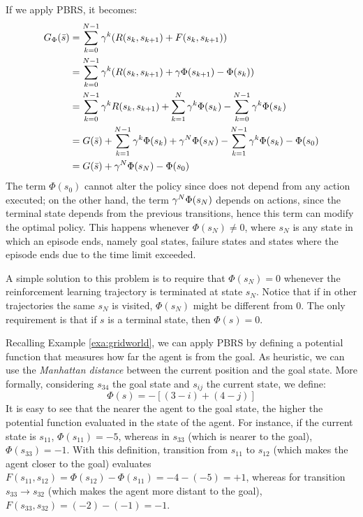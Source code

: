 If we apply PBRS, it becomes:
\begin{align}
	G_{\Phi}(\bar{s}) &= \sum_{k=0}^{N-1} \gamma^{k} (R(s_k, s_{k+1}) + F(s_k, s_{k+1})) \nonumber \\
	&= \sum_{k=0}^{N-1} \gamma^{k} (R(s_k, s_{k+1}) + \gamma\Phi(s_{k+1}) - \Phi(s_k) ) \nonumber \\
	&= \sum_{k=0}^{N-1} \gamma^{k} R(s_k, s_{k+1}) + \sum_{k=1}^{N} \gamma^{k}\Phi(s_{k}) - \sum_{k=0}^{N-1} \gamma^k\Phi(s_k) \nonumber \\
	&= G(\bar{s}) + \sum_{k=1}^{N-1} \gamma^{k}\Phi(s_{k}) + \gamma^N\Phi(s_N) - \sum_{k=1}^{N-1} \gamma^k\Phi(s_k) - \Phi(s_0) \nonumber \\
	&= G(\bar{s}) + \gamma^N\Phi(s_N) - \Phi(s_0) \label{eq:reward-shaping-episodic-terminal-state}
\end{align}
The term $\Phi(s_0)$ cannot alter the policy since does not depend from any action executed; on the other hand, the term $\gamma^N\Phi(s_N)$ depends on actions, since the terminal state depends from the previous transitions, hence this term can modify the optimal policy. This happens whenever $\Phi(s_N)\neq 0$, where $s_N$ is any state in which an episode ends, namely goal states, failure states and states where the episode ends due to the time limit exceeded.

A simple solution to this problem is to require that $\Phi(s_N)=0$ whenever the reinforcement learning trajectory is terminated at state $s_N$. Notice that if in other trajectories the same $s_N$ is visited, $\Phi(s_N)$ might be different from 0. The only requirement is that if $s$ is a terminal state, then $\Phi(s) = 0$.

\medskip
\begin{example}\label{exa:reward-shaping-gridworld}
	Recalling Example \ref{exa:gridworld}, we can apply PBRS by defining a potential function that measures how far the agent is from the goal. As heuristic, we can use the \emph{Manhattan distance} between the current position and the goal state. More formally, considering $s_{34}$ the goal state and $s_{ij}$ the current state, we define:
	\[
	\Phi(s) = - [(3 - i) + (4 - j)]
	\]
	It is easy to see that the nearer the agent to the goal state, the higher the potential function evaluated in the state of the agent. For instance, if the current state is $s_{11}$, $\Phi(s_{11}) = - 5$, whereas in $s_{33}$ (which is nearer to the goal), $\Phi(s_{33}) = -1$. 
	With this definition, transition from $s_{11}$ to $s_{12}$ (which makes the agent closer to the goal) evaluates $F(s_{11}, s_{12}) = \Phi(s_{12}) - \Phi(s_{11}) = - 4 - (- 5) = + 1$, whereas for transition $s_{33}\to s_{32}$ (which makes the agent more distant to the goal), $F(s_{33}, s_{32}) = (- 2) - (- 1) = - 1$. 
	
\end{example}

